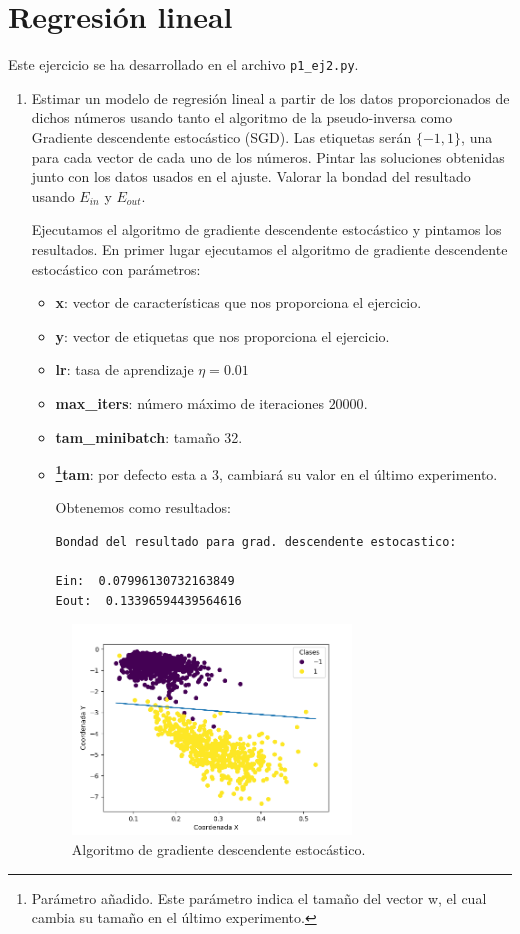 \documentclass[size=a4, parskip=half, titlepage=false, toc=flat, toc=bib, 12pt]{scrartcl}
\begin{document}
\section{Regresión lineal}
Este ejercicio se ha desarrollado en el archivo \verb|p1_ej2.py|.
\begin{enumerate}

\item Estimar un modelo de regresión lineal a partir de los datos proporcionados de
dichos números usando tanto el algoritmo de la pseudo-inversa como Gradiente descendente
estocástico (SGD). Las etiquetas serán $\{−1, 1\}$, una para cada vector de cada uno de los
números. Pintar las soluciones obtenidas junto con los datos usados en el ajuste. Valorar
la bondad del resultado usando $E_{in}$ y $E_{out}$.

Ejecutamos el algoritmo de gradiente descendente estocástico y pintamos los resultados.
En primer lugar ejecutamos el algoritmo de gradiente descendente estocástico con parámetros:
\begin{itemize}
\item \textbf{x}: vector de características que nos proporciona el ejercicio.
\item \textbf{y}: vector de etiquetas que nos proporciona el ejercicio.
\item \textbf{lr}: tasa de aprendizaje $\eta = 0.01$
\item \textbf{max\_iters}: número máximo de iteraciones $20000$.
\item \textbf{tam\_minibatch}: tamaño 32.
\item \textbf{\footnote{Parámetro añadido. Este parámetro indica el tamaño del vector w,
el cual cambia su tamaño en el último experimento.}{tam}}: por defecto esta a 3, cambiará
su valor en el último experimento.

Obtenemos como resultados:
\begin{lstlisting}
Bondad del resultado para grad. descendente estocastico:

Ein:  0.07996130732163849
Eout:  0.13396594439564616
\end{lstlisting}
\end{itemize}
\begin{figure}[H]
\centering
\includegraphics[width=0.7\textwidth]{./img/ej21}
\caption{Algoritmo de gradiente descendente estocástico.}
\end{figure}


\end{enumerate}
\end{document}

